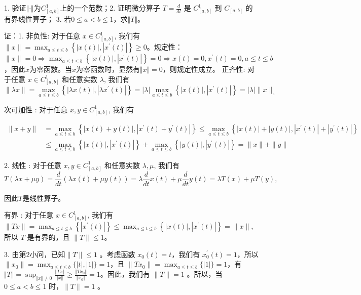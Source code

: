 \documentclass{article}
\begin{document}
\begin{enumerate}
    1. 验证$\Vert \cdot \Vert$为$C_{[a, b]}^1$上的一个范数；2. 证明微分算子 $T=\frac{d}{d t}$ 是 $C_{[a, b]}^1$ 到 $C_{[a, b]}$ 的有界线性算子； 3. 若$0\leq a < b \leq 1$，求$\Vert T \Vert$。 

    证：1. 非负性: 对于任意 $x \in C_{[a, b]}^1$, 我们有 $\|x\|=\max _{a \leq t \leq b}\left\{|x(t)|,\left|x^{\prime}(t)\right|\right\} \geq 0$。规定性：$\|x\|=0 \Rightarrow \max _{a \leq t \leq b}\left\{|x(t)|,\left|x^{\prime}(t)\right|\right\}=0 \Rightarrow x(t)=0, x^{\prime}(t)=0, a \leq t \leq b $，因此$x$为零函数。当$x$为零函数时，显然有$\Vert x \Vert = 0$，则规定性成立。
    正齐性: 对于任意 $x \in C_{[a, b]}^1$ 和任意实数 $\lambda$, 我们有
$$
\|\lambda x\|=\max _{a \leq t \leq b}\left\{|\lambda x(t)|,\left|\lambda x^{\prime}(t)\right|\right\}=|\lambda| \max _{a \leq t \leq b}\left\{|x(t)|,\left|x^{\prime}(t)\right|\right\}=|\lambda|\|x\|_{\circ}
$$

次可加性 : 对于任意 $x, y \in C_{[a, b]}^1$, 我们有

\begin{equation*}
    \begin{aligned}
        \|x+y\|&=\max _{a \leq t \leq b}\left\{|x(t)+y(t)|,\left|x^{\prime}(t)+y^{\prime}(t)\right|\right\} \leq \max _{a \leq t \leq b}\left\{|x(t)|+|y(t)|,\left|x^{\prime}(t)\right|+\left|y^{\prime}(t)\right|\right\} \\
        &\leq \max _{a \leq t \leq b}\left\{|x(t)|,\left|x^{\prime}(t)\right|\right\}+\max _{a \leq t \leq b}\left\{|y(t)|,\left|y^{\prime}(t)\right|\right\}=\|x\|+\|y\|
    \end{aligned}
\end{equation*}

2. 线性 : 对于任意 $x, y \in C_{[a, b]}^1$ 和任意实数 $\lambda, \mu$, 我们有
$$
T(\lambda x+\mu y)=\frac{d}{d t}(\lambda x(t)+\mu y(t))=\lambda \frac{d}{d t} x(t)+\mu \frac{d}{d t} y(t)=\lambda T(x)+\mu T(y),
$$

因此$T$是线性算子。

有界 : 对于任意 $x \in C_{[a, b]}^1$, 我们有 $\|T x\|=\max _{a \leq t \leq b}\left\{\left|x^{\prime}(t)\right|\right\} \leq \max _{a \leq t \leq b}\left\{|x(t)|,\left|x^{\prime}(t)\right|\right\}=\|x\|$,
所以 $T$ 是有界的，且 $\|T\| \leq 1$。

3. 由第2小问，已知$\|T\| \leq 1$ 。考虑函数 $x_0(t)=t$，我们有 $x_0^{\prime}(t)=1$，所以 $\|x_0\|=\max _{a \leq t \leq b}\{|t|,|1|\}=1$，且 $\|T x_0\|=\max _{a \leq t \leq b}\{|1|\}=1$，有$\Vert T \Vert = \sup_{\Vert x \Vert \neq 0}\frac{\Vert Tx \Vert}{\Vert x \Vert} \geq \frac{\Vert Tx_0 \Vert}{\Vert x_0 \Vert} = 1$。因此，我们有 $\|T\|=1$ 。所以，当 $0 \leq a<b \leq 1$ 时，$\|T\|=1$ 。


\end{enumerate}
\end{document}

